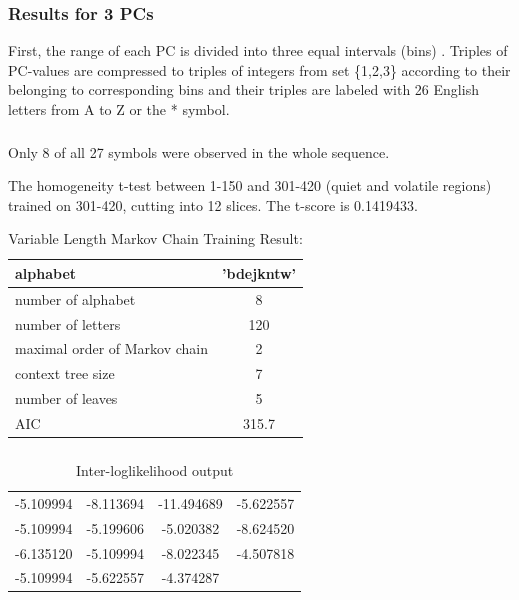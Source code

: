 \documentclass{beamer}
\begin{document}
\begin{frame}
\frametitle{Results for 3 PCs}
First, the range of each PC is divided into three equal intervals (bins) . Triples of PC-values are
compressed to triples of  integers from set \{1,2,3\} according to their belonging to corresponding
bins and their triples are labeled with 26
English letters from A to Z or the * symbol. 


\end{frame}
\begin{frame}
\frametitle{}
Only 8 of all 27 symbols were observed in the whole sequence.

The homogeneity t-test between 1-150 and 301-420 (quiet and volatile
regions)
trained on 301-420, cutting into 12 slices. The t-score is 0.1419433.\\

\begin{table}[H]
\caption{ Variable Length Markov Chain Training Result:} 
\centering
\begin{tabular}{l | c  }
    \hline
    alphabet  & 'bdejkntw' \\ \hline
    number of alphabet &  8 \\ \hline
    number of letters &  120 \\ \hline
    maximal order of Markov chain & 2 \\ \hline
    context tree size & 7 \\ \hline
    number of leaves & 5\\ \hline
    AIC & 315.7 \\ \hline
  \end{tabular}
\end{table}

\end{frame}
\begin{frame}
\frametitle{}
\begin{table}[h!]
\caption{Inter-loglikelihood output} %
\centering
\begin{tabular}{c c c c} %
\hline %
-5.109994  &-8.113694 &-11.494689 & -5.622557 \\
 -5.109994  &-5.199606  &-5.020382  &-8.624520  \\
-6.135120  &-5.109994  &-8.022345  &-4.507818  \\
 -5.109994  &-5.622557 & -4.374287 \\
\hline %
\end{tabular}
\end{table}


\end{frame}
\end{document}
